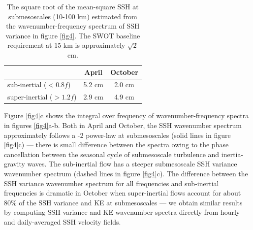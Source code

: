 \documentclass[grl]{agutex2015}
\begin{document}
\begin{article}
\begin{table}
\label{tab1}
\caption{The square root of the mean-square SSH at submesoscales (10-100 km)
        estimated from the wavenumber-frequency spectrum of SSH variance in figure \ref{fig4}.
        The SWOT baseline requirement at 15 km is approximately $\sqrt{2}$ cm.
        }
  \begin{center}
    \begin{tabular}{  l | c | c }
    \hline
    & April & October\\
    \hline
  sub-inertial ($<0.8f$)   & 5.2 cm & 2.0 cm  \\
  super-inertial ($>1.2f$) & 2.9 cm  & 4.9 cm\\
  \hline
    \end{tabular}
  \end{center}
\end{table}

Figure \ref{fig4}c shows the integral over frequency
of wavenumber-frequency spectra in figures \ref{fig4}a-b.
Both in April and October, the
SSH wavenumber spectrum approximately follows a -2 power-law at submesoscales
(solid lines in figure \ref{fig4}c)  --- there is
small difference between the spectra owing to the phase cancellation between the
seasonal cycle of submesoscale turbulence and inertia-gravity waves. The sub-inertial flow
has a steeper submesoscale SSH variance wavenumber spectrum (dashed lines in figure \ref{fig4}c).
 The difference between the SSH variance wavenumber spectrum for all frequencies and
 sub-inertial frequencies is dramatic in October when super-inertial flows account for
 about 80\% of the SSH variance and KE at submesoscales --- we obtain similar results by computing
SSH variance and KE wavenumber spectra directly from hourly and daily-averaged
SSH velocity fields.




%
%
%


\end{article}
\end{document}
